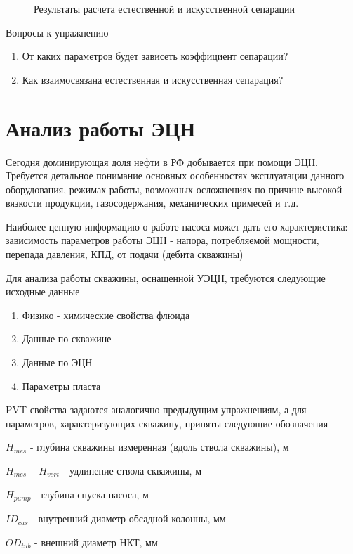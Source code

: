 \begin{figure}[h!]
	\center{\texttt{[image: Ex60\_2]}}
	\caption{Результаты расчета естественной и искусственной сепарации}
	\label{ris:Ex60_2}
\end{figure}

Вопросы к упражнению

\begin{enumerate}
	\item От каких параметров будет зависеть коэффициент сепарации?
	\item Как взаимосвязана естественная и искусственная сепарация? 
\end{enumerate}


\section{Анализ работы ЭЦН}

Сегодня доминирующая доля нефти в РФ добывается при помощи ЭЦН. Требуется детальное понимание основных особенностях эксплуатации данного оборудования, режимах работы, возможных осложнениях по причине высокой вязкости продукции, газосодержания, механических примесей и т.д.

Наиболее ценную информацию о работе насоса может дать его характеристика: зависимость параметров работы ЭЦН - напора, потребляемой мощности, перепада давления, КПД, от подачи (дебита скважины)

Для анализа работы скважины, оснащенной УЭЦН, требуются следующие исходные данные

\begin{enumerate}
	\item Физико - химические свойства флюида
	\item Данные по скважине
	\item Данные по ЭЦН
	\item Параметры пласта
\end{enumerate}

PVT свойства задаются аналогично предыдущим упражнениям, а для параметров, характеризующих скважину, приняты следующие обозначения

$H_{mes}$ - глубина скважины измеренная (вдоль ствола скважины), м

$H_{mes}- H_{vert}$ - удлинение ствола скважины, м

$H_{pump}$ - глубина спуска насоса, м

$ID_{cas}$ - внутренний диаметр обсадной колонны, мм

$OD_{tub}$ - внешний диаметр НКТ, мм


